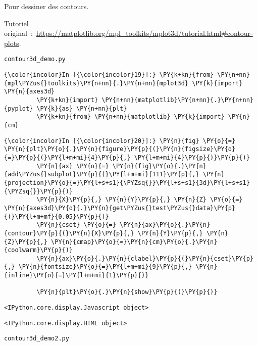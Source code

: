    Pour dessiner des contours.

    Tutoriel
original~:~\url{https://matplotlib.org/mpl_toolkits/mplot3d/tutorial.html\#contour-plots}.

    \texttt{contour3d\_demo.py}

    \begin{Verbatim}[commandchars=\\\{\}]
{\color{incolor}In [{\color{incolor}19}]:} \PY{k+kn}{from} \PY{n+nn}{mpl\PYZus{}toolkits}\PY{n+nn}{.}\PY{n+nn}{mplot3d} \PY{k}{import} \PY{n}{axes3d}
         \PY{k+kn}{import} \PY{n+nn}{matplotlib}\PY{n+nn}{.}\PY{n+nn}{pyplot} \PY{k}{as} \PY{n+nn}{plt}
         \PY{k+kn}{from} \PY{n+nn}{matplotlib} \PY{k}{import} \PY{n}{cm}
\end{Verbatim}


    \begin{Verbatim}[commandchars=\\\{\}]
{\color{incolor}In [{\color{incolor}20}]:} \PY{n}{fig} \PY{o}{=} \PY{n}{plt}\PY{o}{.}\PY{n}{figure}\PY{p}{(}\PY{n}{figsize}\PY{o}{=}\PY{p}{(}\PY{l+m+mi}{4}\PY{p}{,} \PY{l+m+mi}{4}\PY{p}{)}\PY{p}{)}
         \PY{n}{ax} \PY{o}{=} \PY{n}{fig}\PY{o}{.}\PY{n}{add\PYZus{}subplot}\PY{p}{(}\PY{l+m+mi}{111}\PY{p}{,} \PY{n}{projection}\PY{o}{=}\PY{l+s+s1}{\PYZsq{}}\PY{l+s+s1}{3d}\PY{l+s+s1}{\PYZsq{}}\PY{p}{)}
         \PY{n}{X}\PY{p}{,} \PY{n}{Y}\PY{p}{,} \PY{n}{Z} \PY{o}{=} \PY{n}{axes3d}\PY{o}{.}\PY{n}{get\PYZus{}test\PYZus{}data}\PY{p}{(}\PY{l+m+mf}{0.05}\PY{p}{)}
         \PY{n}{cset} \PY{o}{=} \PY{n}{ax}\PY{o}{.}\PY{n}{contour}\PY{p}{(}\PY{n}{X}\PY{p}{,} \PY{n}{Y}\PY{p}{,} \PY{n}{Z}\PY{p}{,} \PY{n}{cmap}\PY{o}{=}\PY{n}{cm}\PY{o}{.}\PY{n}{coolwarm}\PY{p}{)}
         \PY{n}{ax}\PY{o}{.}\PY{n}{clabel}\PY{p}{(}\PY{n}{cset}\PY{p}{,} \PY{n}{fontsize}\PY{o}{=}\PY{l+m+mi}{9}\PY{p}{,} \PY{n}{inline}\PY{o}{=}\PY{l+m+mi}{1}\PY{p}{)}
         
         \PY{n}{plt}\PY{o}{.}\PY{n}{show}\PY{p}{(}\PY{p}{)}
\end{Verbatim}


    
    \begin{verbatim}
<IPython.core.display.Javascript object>
    \end{verbatim}

    
    
    \begin{verbatim}
<IPython.core.display.HTML object>
    \end{verbatim}

    
    \texttt{contour3d\_demo2.py}

